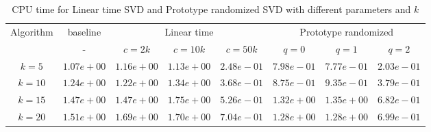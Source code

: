 \begin{table}\label{time21}
\centering
\begin{tabular}{|c|c|c|c|c|c|c|c|}

\hline
\multirow{2}{*}{ Algorithm} &\multicolumn{1}{c|}{baseline} &\multicolumn{3}{c|}{Linear time} &\multicolumn{3}{c|}{Prototype randomized}\\\cline{2-8}
 &- &$c=2k$ &$c=10k$ &$c=50k$ &$q=0$ &$q=1$ &$q=2$\\\hline
$k=5$ & $1.07e+00$ & $1.16e+00$ & $1.13e+00$ & $2.48e-01$ & $7.98e-01$ & $7.77e-01$ & $2.03e-01$\\\hline
$k=10$ & $1.24e+00$ & $1.22e+00$ & $1.34e+00$ & $3.68e-01$ & $8.75e-01$ & $9.35e-01$ & $3.79e-01$\\\hline
$k=15$ & $1.47e+00$ & $1.47e+00$ & $1.75e+00$ & $5.26e-01$ & $1.32e+00$ & $1.35e+00$ & $6.82e-01$\\\hline
$k=20$ & $1.51e+00$ & $1.69e+00$ & $1.70e+00$ & $7.04e-01$ & $1.28e+00$ & $1.28e+00$ & $6.99e-01$\\\hline
\end{tabular}
\caption{CPU time for Linear time SVD and Prototype randomized SVD with different parameters and $k$}
\end{table}
